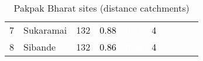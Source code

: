 \begin{table}[ht]
\begin{tabular}{C{0.05\textwidth}C{0.15\textwidth}C{0.08\textwidth}C{0.08\textwidth}C{0.08\textwidth}C{0.08\textwidth}C{0.08\textwidth}C{0.08\textwidth}C{0.08\textwidth}C{0.08\textwidth}}
  {7} & Sukaramai & 132 & \textcolor[HTML]{000000}{0.88} & \textcolor[HTML]{FFFFFF}{0.47} & \textcolor[HTML]{000000}{4} &  &  &  &  \\ 
  {8} & Sibande & 132 & \textcolor[HTML]{000000}{0.86} & \textcolor[HTML]{FFFFFF}{0.50} & \textcolor[HTML]{000000}{4} &  &  &  &  \\ 
  \end{tabular}
\endgroup
\caption{Pakpak Bharat sites (distance catchments)} 
\end{table}
